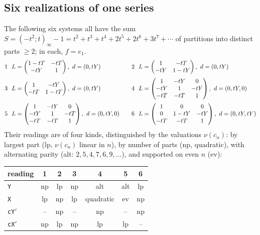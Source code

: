 \documentclass[11pt,a4paper]{article}
\newcommand{\val}{\nu}
\theoremstyle{plain}
\theoremstyle{definition}
\theoremstyle{remark}
\begin{document}
\subsection{Six realizations of one series}\label{sec:six}
The following six systems all have the sum
$S=(-t^2;t)_\infty-1=t^2+t^3+t^4+2t^5+2t^6+3t^7+\cdots$ of partitions into
distinct parts $\ge2$; in each, $f=e_1$.
\[
\begin{array}{@{}c@{\ \ }l@{\qquad}c@{\ \ }l@{}}
1&L=\begin{pmatrix}1-tT&-tT\\-tY&1\end{pmatrix},\ d=(0,tY)&
2&L=\begin{pmatrix}1&-tT\\-tY&1-tY\end{pmatrix},\ d=(0,tY)\\[12pt]
3&L=\begin{pmatrix}1&-tY\\-tT&1-tT\end{pmatrix},\ d=(0,tY)&
4&L=\begin{pmatrix}1&-tY&0\\-tY&1&-tY\\-tT&-tT&1\end{pmatrix},\ d=(0,tY,0)\\[18pt]
5&L=\begin{pmatrix}1&-tY&0\\-tY&1&-tT\\-tT&-tT&1\end{pmatrix},\ d=(0,tY,0)&
6&L=\begin{pmatrix}1&0&0\\0&1-tY&-tY\\-tT&-tT&1\end{pmatrix},\ d=(0,tY,tY)
\end{array}
\]
Their readings are of four kinds, distinguished by the valuations $\val(c_n)$:
by largest part (\textsf{lp}, $\val(c_n)$ linear in $n$), by number of parts
(\textsf{np}, quadratic), with alternating parity (\textsf{alt}:
$2,5,4,7,6,9,\dots$), and supported on even $n$ (\textsf{ev}):
\begin{center}
\begin{tabular}{@{}lcccccc@{}}
\toprule
reading & 1 & 2 & 3 & 4 & 5 & 6\\\midrule
\texttt{Y}    & \textsf{np} & \textsf{lp} & \textsf{np} & \textsf{alt} & \textsf{alt} & \textsf{lp}\\
\texttt{X}    & \textsf{lp} & \textsf{np} & \textsf{lp} & quadratic & \textsf{ev} & \textsf{np}\\
\texttt{cY$'$} & -- & \textsf{np} & -- & \textsf{np} & -- & \textsf{np}\\
\texttt{cX$'$} & \textsf{np} & \textsf{lp} & \textsf{np} & \textsf{lp} & \textsf{lp} & --\\
\bottomrule
\end{tabular}
\end{center}
\end{document}
